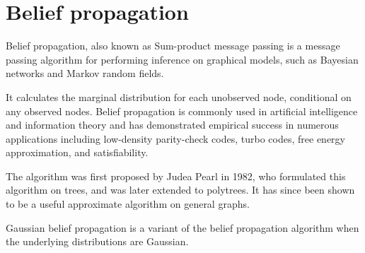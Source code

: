 
\section*{Belief propagation}

Belief propagation, also known as Sum-product message passing is a message passing algorithm for performing inference on graphical models, such as Bayesian networks and Markov random fields.

It calculates the marginal distribution for each unobserved node, conditional on any observed nodes. Belief propagation is commonly used in artificial intelligence and information theory and has demonstrated empirical success in numerous applications including low-density parity-check codes, turbo codes, free energy approximation, and satisfiability.

 

The algorithm was first proposed by Judea Pearl in 1982, who formulated this algorithm on trees, and was later extended to polytrees. It has since been shown to be a useful approximate algorithm on general graphs.


Gaussian belief propagation is a variant of the belief propagation algorithm when the underlying distributions are Gaussian.



